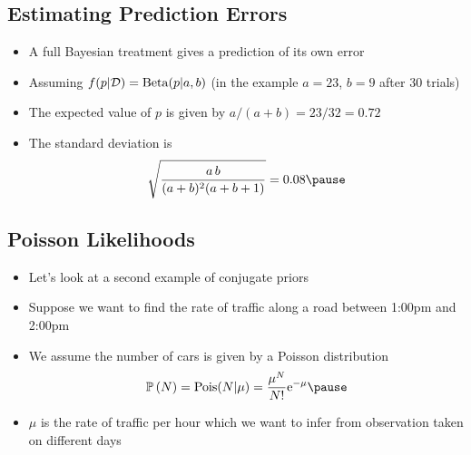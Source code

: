 \begin{slide}
\section{Estimating Prediction Errors}

\begin{PauseHighLight}
  \begin{itemize}
  \item A full Bayesian treatment gives a prediction of its own
    error\pause
  \item Assuming $f(p|\mathcal{D}) = \mathrm{Beta}(p|a,b)$ (in the example
    $a=23$, $b=9$ after 30 trials)
  \item The expected value of $p$ is given by $a/(a+b) = 23/32 = 0.72$\pause
  \item The standard deviation is
    \begin{align*}
      \sqrt{\frac{a\,b}{(a+b)^2(a+b+1)}} = 0.08\pause
    \end{align*}
  \end{itemize}
\end{PauseHighLight}

\end{slide}

\begin{slide}
\section{Poisson Likelihoods}

\begin{PauseHighLight}
  \begin{itemize}
  \item Let's look at a second example of conjugate priors\pause
  \item Suppose we want to find the rate of traffic along a road between
    1:00pm and 2:00pm\pause
  \item We assume the number of cars is given by a Poisson distribution
    \begin{align*}
      \Prob{N} = \mathrm{Pois}(N|\mu) = \frac{\mu^N}{N!} \e{-\mu}\pause
    \end{align*}
  \item $\mu$ is the rate of traffic per hour which we want to infer
    from observation taken on different days\pause
  \end{itemize}
\end{PauseHighLight}

\end{slide}

